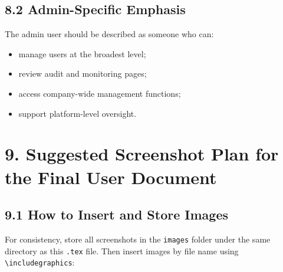 \documentclass[10pt,a4paper]{article}
\begin{document}
\subsection*{8.2 Admin-Specific Emphasis}
The admin user should be described as someone who can:
\begin{itemize}[leftmargin=1.4em,itemsep=2pt,topsep=2pt]
    \item manage users at the broadest level;
    \item review audit and monitoring pages;
    \item access company-wide management functions;
    \item support platform-level oversight.
\end{itemize}


\section*{9. Suggested Screenshot Plan for the Final User Document}

\subsection*{9.1 How to Insert and Store Images}
For consistency, store all screenshots in the \texttt{images} folder under the same directory as this \texttt{.tex} file. Then insert images by file name using \texttt{\textbackslash includegraphics}:
\end{document}
